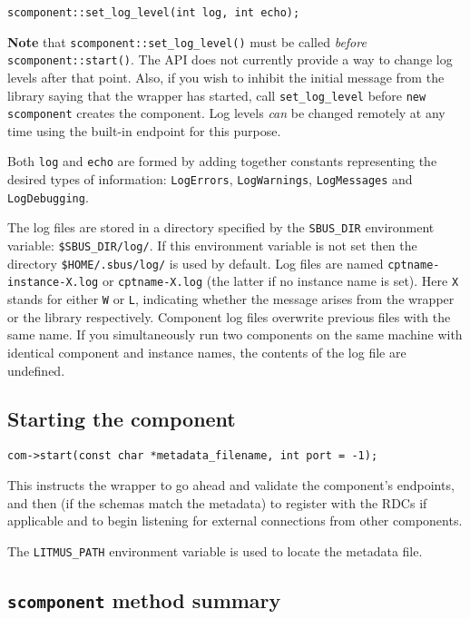 \documentclass[12pt,a4paper,twoside]{article}
\renewcommand{\_}{\texttt{\symbol{95}}}
\begin{document}
\begin{verbatim}
scomponent::set_log_level(int log, int echo);
\end{verbatim}

\textbf{Note} that \verb^scomponent::set_log_level()^ must be called
\textit{before} \verb^scomponent::start()^. The API does not currently
provide a way to change log levels after that point.
Also, if you wish to inhibit the initial message from the library saying
that the wrapper has started, call \verb^set_log_level^ before
\verb^new scomponent^ creates the component.
Log levels \textit{can} be changed remotely at any time using the built-in
endpoint for this purpose.

Both \verb^log^ and \verb^echo^ are formed by adding together
constants representing the desired types of information:
\verb^LogErrors^, \verb^LogWarnings^, \verb^LogMessages^ and
\verb^LogDebugging^.

The log files are stored in a directory specified by the \verb^SBUS_DIR^
environment variable: \verb^$SBUS_DIR/log/^.
If this environment variable is not set then the
directory \verb^$HOME/.sbus/log/^ is used by default.
Log files are named \verb^cptname-instance-X.log^ or \verb^cptname-X.log^
(the latter if no instance name is set).
Here \verb^X^ stands for either \verb^W^ or \verb^L^, indicating whether
the message arises from the wrapper or the library respectively.
Component log files overwrite previous files with the same name.
If you simultaneously run two components on the same machine with
identical component and instance names, the contents of the log
file are undefined.

\subsection{Starting the component}

\begin{verbatim}
com->start(const char *metadata_filename, int port = -1);
\end{verbatim}

This instructs the wrapper to go ahead and validate the component's
endpoints, and then (if the schemas match the metadata) to register
with the RDCs if applicable and to begin listening for external
connections from other components.

The \verb^LITMUS_PATH^ environment variable is used to locate the
metadata file.

\subsection{\texttt{scomponent} method summary}
\end{document}
